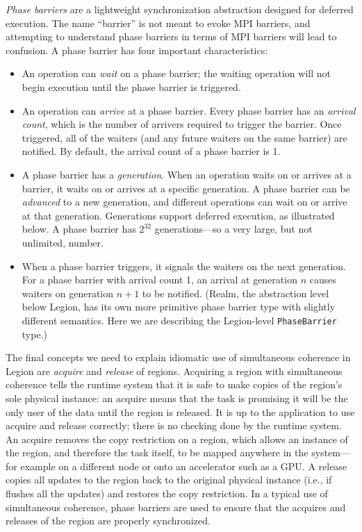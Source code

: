 {\em Phase barriers} are a lightweight synchronization abstraction designed for deferred execution.  The name ``barrier'' is not meant to evoke MPI barriers, and attempting
to understand phase barriers in terms of MPI barriers will lead to confusion.  A phase barrier has four important characteristics:
\begin{itemize}
\item An operation can {\em wait} on a phase barrier; the waiting operation will not begin execution until the phase barrier is triggered.
\item An operation can {\em arrive} at a phase barrier.  Every phase barrier has an {\em arrival count}, which is the number of arrivers required to trigger the barrier.  Once triggered, all of the waiters (and any future waiters on the same barrier) are notified.  By default,
  the arrival count of a phase barrier is 1.
\item A phase barrier has a {\em generation}.  When an operation waits on or arrives at a barrier, it waits on or arrives at a specific generation.  A phase barrier can be {\em advanced} to a new generation, and different operations can wait on or arrive at that
  generation.  Generations support deferred execution, as illustrated below.  A phase barrier has $2^{32}$ generations---so a very large, but not unlimited, number.
\item When a phase barrier triggers, it signals the waiters on the next generation.  For a phase barrier with arrival count 1, an arrival at generation $n$ causes waiters on generation $n+1$ to be notified.  (Realm, the abstraction level below Legion, has its own more primitive phase barrier type
  with slightly different semantics.  Here we are describing the Legion-level {\tt PhaseBarrier} type.)
\end{itemize}

\begin{figure}
  
  \caption{}
  \label{fig:sim}
\end{figure}

The final concepts we need to explain idiomatic use of simultaneous coherence in Legion are {\em acquire} and {\em release} of regions.  Acquiring a region with simultaneous coherence tells the runtime system that it is safe to make copies of the region's sole physical instance: an acquire means that the task is promising it will be the only user of the data until the region is released.  It is up to the application to use acquire and release correctly; there is no checking done by the runtime system.  An acquire removes the copy restriction on a region, which allows
an instance of the region, and therefore the task itself, to be mapped anywhere in the system---for example on a different node or onto an accelerator such as a GPU.
A release copies all updates to the region back to the original physical instance (i.e., if flushes all the updates) and restores the copy restriction.  In a typical use of simultaneous coherence, phase barriers are used to ensure that the acquires and releases of the region
are properly synchronized.

